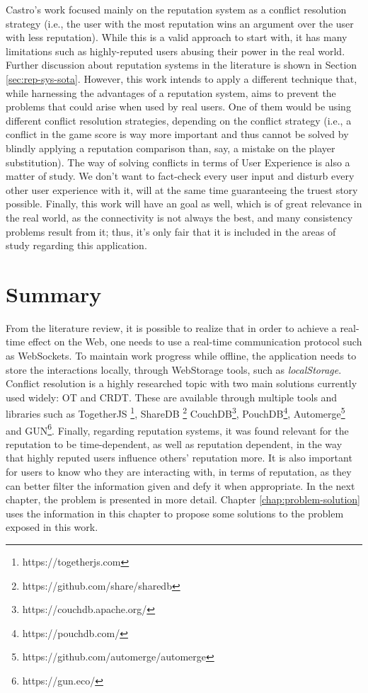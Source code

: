 Castro's work focused mainly on the reputation system as a conflict resolution strategy (i.e., the user with the most reputation wins an argument over the user with less reputation). While this is a valid approach to start with, it has many limitations such as highly-reputed users abusing their power in the real world. Further discussion about reputation systems in the literature is shown in Section \ref{sec:rep-sys-sota}. However, this work intends to apply a different technique that, while harnessing the advantages of a reputation system, aims to prevent the problems that could arise when used by real users. One of them would be using different conflict resolution strategies, depending on the conflict strategy (i.e., a conflict in the game score is way more important and thus cannot be solved by blindly applying a reputation comparison than, say, a mistake on the player substitution). The way of solving conflicts in terms of User Experience is also a matter of study. We don't want to fact-check every user input and disturb every other user experience with it, will at the same time guaranteeing the truest story possible. Finally, this work will have an  goal as well, which is of great relevance in the real world, as the connectivity is not always the best, and many consistency problems result from it; thus, it's only fair that it is included in the areas of study regarding this application.

\section{Summary}

From the literature review, it is possible to realize that in order to achieve a real-time effect on the Web, one needs to use a real-time communication protocol such as WebSockets. To maintain work progress while offline, the application needs to store the interactions locally, through WebStorage tools, such as \textit{localStorage}. Conflict resolution is a highly researched topic with two main solutions currently used widely: OT and CRDT. These are available through multiple tools and libraries such as TogetherJS \footnote{https://togetherjs.com}, ShareDB \footnote{https://github.com/share/sharedb} CouchDB\footnote{https://couchdb.apache.org/}, PouchDB\footnote{https://pouchdb.com/}, Automerge\footnote{https://github.com/automerge/automerge} and GUN\footnote{https://gun.eco/}. Finally, regarding reputation systems, it was found relevant for the reputation to be time-dependent, as well as reputation dependent, in the way that highly reputed users influence others' reputation more. It is also important for users to know who they are interacting with, in terms of reputation, as they can better filter the information given and defy it when appropriate. In the next chapter, the problem is presented in more detail. Chapter \ref{chap:problem-solution} uses the information in this chapter to propose some solutions to the problem exposed in this work. 